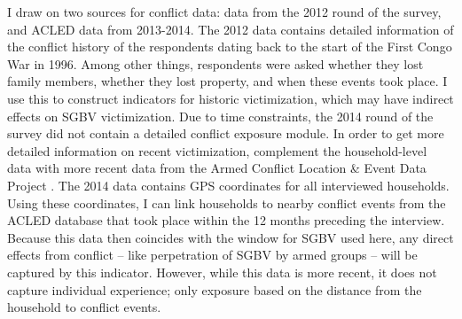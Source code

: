 I draw on two sources for conflict data: data from the 2012 round of the survey, and ACLED data from 2013-2014. The 2012 data contains detailed information of the conflict history of the respondents dating back to the start of the First Congo War in 1996. Among other things, respondents were asked whether they lost family members, whether they lost property, and when these events took place. I use this to construct indicators for historic victimization, which may have indirect effects on SGBV victimization.  Due to time constraints, the 2014 round of the survey did not contain a detailed conflict exposure module. In order to get more detailed information on recent victimization, complement the household-level data with more recent data from the Armed Conflict Location \& Event Data Project \citep[ACLED;][]{Raleigh2010}. The 2014 data contains GPS coordinates for all interviewed households. Using these coordinates, I can link households to nearby conflict events from the ACLED database that took place within the 12 months preceding the interview. Because this data then coincides with the window for SGBV used here, any direct effects from conflict -- like perpetration of SGBV by armed groups -- will be captured by this indicator. However, while this data is more recent, it does not capture individual experience; only exposure based on the distance from the household to conflict events. 


